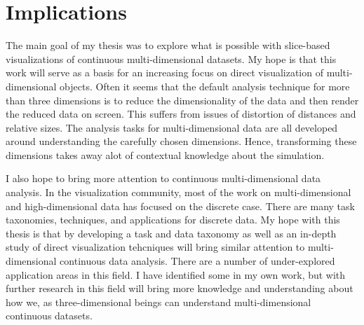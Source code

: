 
\section{Implications}

The main goal of my thesis was to explore what is possible with slice-based
visualizations of continuous multi-dimensional datasets. My hope is that this
work will serve as a basis for an increasing focus on direct visualization of
multi-dimensional objects. Often it seems that the default analysis technique
for more than three dimensions is to reduce
the dimensionality of the
data and then render the reduced data on screen. This suffers from issues of
distortion of distances and relative sizes. The analysis tasks for
multi-dimensional data are all developed around understanding the carefully
chosen dimensions. Hence, transforming these dimensions takes away alot of
contextual knowledge about the simulation. 

I also hope to bring more attention to continuous multi-dimensional data analysis.
In the visualization community, most of the work on multi-dimensional and high-dimensional
data has focused on the discrete case. There are many task taxonomies, techniques,
and applications for discrete data. My hope with this thesis is that by developing
a task and data taxonomy as well as an in-depth study of direct visualization
tehcniques will bring similar attention to multi-dimensional continuous data
analysis. There are a number of under-explored application areas in this
field. I have identified some in my own work, but with further research in this
field will bring more knowledge and understanding about how we, as three-dimensional
beings can understand multi-dimensional continuous datasets.




